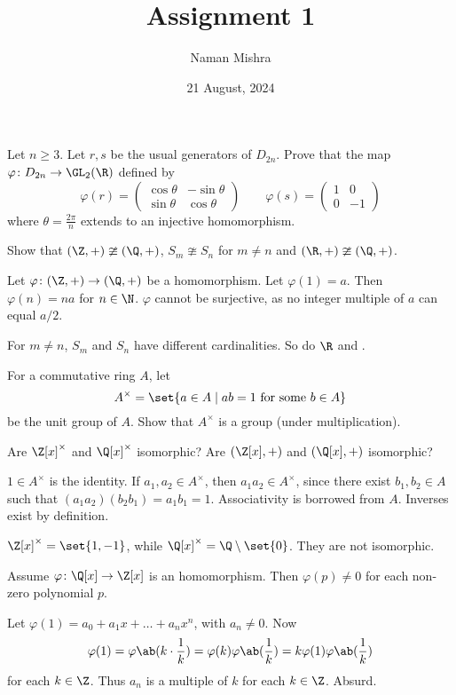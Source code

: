 \documentclass[12pt]{article}
\title{Assignment 1}
\author{Naman Mishra}
\date{21 August, 2024}
\begin{document}
\maketitle

\begin{problem}
    Let $n \ge 3$.
    Let $r, s$ be the usual generators of $D_{2n}$.
    Prove that the map $\varphi\colon D_{2n} \to \GL_2(\R)$ defined by
    \[
        \varphi(r) = \begin{pmatrix}
            \cos \theta & -\sin \theta \\
            \sin \theta & \cos \theta
        \end{pmatrix} \qquad \varphi(s) = \begin{pmatrix}
            1 & 0 \\
            0 & -1
        \end{pmatrix}
    \] where $\theta = \frac{2\pi}{n}$ extends to an injective
    homomorphism.
\end{problem}

\begin{problem}
    Show that $(\Z, +) \ncong (\Q, +)$,
    $S_m \ncong S_n$ for $m \ne n$ and $(\R, +) \ncong (\Q, +)$.
\end{problem}
\begin{solution}
    Let $\varphi\colon (\Z, +) \to (\Q, +)$ be a homomorphism.
    Let $\varphi(1) = a$.
    Then $\varphi(n) = na$ for $n \in \N$.
    $\varphi$ cannot be surjective, as no integer multiple of $a$ can
    equal $a/2$.

    For $m \ne n$, $S_m$ and $S_n$ have different cardinalities.
    So do $\R$ and \Q.
\end{solution}

\begin{problem}
    For a commutative ring $A$, let \[
        A^\times = \set{a \in A \mid ab = 1 \text{ for some } b \in A}
    \] be the unit group of $A$.
    Show that $A^\times$ is a group (under multiplication).

    Are $\Z[x]^\times$ and $\Q[x]^\times$ isomorphic?
    Are $(\Z[x], +)$ and $(\Q[x], +)$ isomorphic?
\end{problem}
\begin{solution}
    $1 \in A^\times$ is the identity.
    If $a_1, a_2 \in A^\times$, then $a_1 a_2 \in A^\times$,
    since there exist $b_1, b_2 \in A$ such that $(a_1 a_2) (b_2 b_1) =
    a_1 b_1 = 1$.
    Associativity is borrowed from $A$.
    Inverses exist by definition.

    $\Z[x]^\times = \set{1, -1}$,
    while $\Q[x]^\times = \Q \setminus \set{0}$.
    They are not isomorphic.

    Assume $\varphi\colon \Q[x] \to \Z[x]$ is an homomorphism.
    Then $\varphi(p) \ne 0$ for each non-zero polynomial $p$.

    Let $\varphi(1) = a_0 + a_1 x + \dots + a_n x^n$, with $a_n \ne 0$.
    Now \[
        \varphi(1) = \varphi\ab(k \cdot \frac1k)
            = \varphi(k) \varphi\ab(\frac1k)
            = k \varphi(1) \varphi\ab(\frac1k)
    \] for each $k \in \Z$.
    Thus $a_n$ is a multiple of $k$ for each $k \in \Z$.
    Absurd.
\end{solution}
\end{document}
